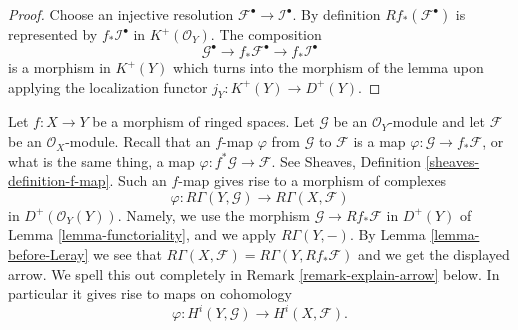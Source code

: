 \begin{proof}
Choose an injective resolution $\mathcal{F}^\bullet \to \mathcal{I}^\bullet$.
By definition $Rf_*(\mathcal{F}^\bullet)$ is represented by
$f_*\mathcal{I}^\bullet$ in $K^{+}(\mathcal{O}_Y)$.
The composition
$$
\mathcal{G}^\bullet \to f_*\mathcal{F}^\bullet \to f_*\mathcal{I}^\bullet
$$
is a morphism in $K^{+}(Y)$ which turns
into the morphism of the lemma upon applying the
localization functor $j_Y : K^{+}(Y) \to D^{+}(Y)$.
\end{proof}

\noindent
Let $f : X \to Y$ be a morphism of ringed spaces.
Let $\mathcal{G}$ be an $\mathcal{O}_Y$-module and let
$\mathcal{F}$ be an $\mathcal{O}_X$-module. Recall that an
$f$-map $\varphi$ from $\mathcal{G}$ to $\mathcal{F}$ is a map
$\varphi : \mathcal{G} \to f_*\mathcal{F}$, or what is the same
thing, a map $\varphi : f^*\mathcal{G} \to \mathcal{F}$.
See Sheaves, Definition \ref{sheaves-definition-f-map}.
Such an $f$-map gives rise to a morphism of complexes
\begin{equation}
\label{equation-functorial-derived}
\varphi :
R\Gamma(Y, \mathcal{G})
\longrightarrow
R\Gamma(X, \mathcal{F})
\end{equation}
in $D^{+}(\mathcal{O}_Y(Y))$. Namely, we use the morphism
$\mathcal{G} \to Rf_*\mathcal{F}$ in $D^{+}(Y)$ of
Lemma \ref{lemma-functoriality}, and we apply $R\Gamma(Y, -)$.
By Lemma \ref{lemma-before-Leray} we see that
$R\Gamma(X, \mathcal{F}) = R\Gamma(Y, Rf_*\mathcal{F})$
and we get the displayed arrow. We spell this out completely in
Remark \ref{remark-explain-arrow} below.
In particular it gives
rise to maps on cohomology
\begin{equation}
\label{equation-functorial}
\varphi : H^i(Y, \mathcal{G}) \longrightarrow H^i(X, \mathcal{F}).
\end{equation}

